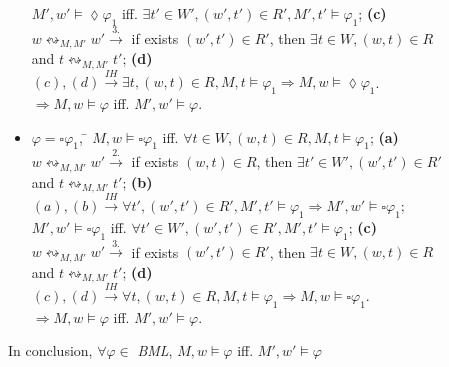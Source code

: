 \documentclass[10pt,a4paper]{article}
\begin{document}
\begin{itemize}
\begin{tabbing}
\> $M', w' \models \lozenge \varphi_1$ iff. $\exists t' \in W', (w', t') \in R', M', t' \models \varphi_1$; \textbf{(c)}\\
\> $w \leftrightsquigarrow_{M, M'} w' \xrightarrow{3.}$ if exists $(w', t') \in R'$, then $\exists t \in W, (w, t) \in R$\\
\> and $t \leftrightsquigarrow_{M, M'} t'$; \textbf{(d)}\\
\> $(c), (d) \xrightarrow{IH} \exists t, (w, t) \in R, M, t \models \varphi_1 \Rightarrow M, w \models \lozenge \varphi_1$.\\
$\Rightarrow M, w \models \varphi$ iff. $M', w' \models \varphi$.
\end{tabbing}
\item
\begin{tabbing}
$\varphi = \square \varphi_1$, \= $M, w \models \square \varphi_1$ iff. $\forall t \in W, (w, t) \in R, M, t \models \varphi_1$; \textbf{(a)}\\
\> $w \leftrightsquigarrow_{M, M'} w' \xrightarrow{2.}$ if exists $(w, t) \in R$, then $\exists t' \in W', (w', t') \in R'$\\
\> and $t \leftrightsquigarrow_{M, M'} t'$; \textbf{(b)}\\
\> $(a), (b) \xrightarrow{IH} \forall t', (w', t') \in R', M', t' \models \varphi_1 \Rightarrow M', w' \models \square \varphi_1$;\\
\> $M', w' \models \square \varphi_1$ iff. $\forall t' \in W', (w', t') \in R', M', t' \models \varphi_1$; \textbf{(c)}\\
\> $w \leftrightsquigarrow_{M, M'} w' \xrightarrow{3.}$ if exists $(w', t') \in R'$, then $\exists t \in W, (w, t) \in R$\\
\> and $t \leftrightsquigarrow_{M, M'} t'$; \textbf{(d)}\\
\> $(c), (d) \xrightarrow{IH} \forall t, (w, t) \in R, M, t \models \varphi_1 \Rightarrow M, w \models \square \varphi_1$.\\
$\Rightarrow M, w \models \varphi$ iff. $M', w' \models \varphi$.
\end{tabbing}
\end{itemize}

In conclusion, $\forall \varphi \in$ \textit{BML}, $M, w \models \varphi$ iff. $M', w' \models \varphi$
\end{document}
